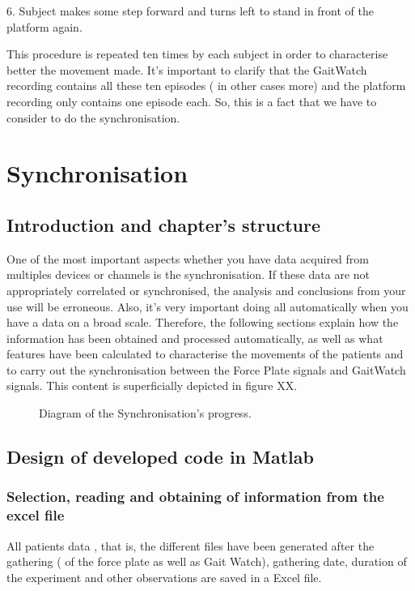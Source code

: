 6.	Subject makes some step  forward and turns left to stand in front of the platform again.

This procedure is repeated ten times by each subject in order to characterise better the movement made.
It’s important to clarify that the GaitWatch recording contains all these ten episodes ( in other cases more) and the platform recording only contains one episode each. So, this is a fact that we have to consider to do the synchronisation.

\section{Synchronisation}

\subsection{Introduction and chapter's structure}
One of the most important aspects whether you have data acquired from multiples devices or channels is the synchronisation. If these data are not appropriately correlated or synchronised, the analysis and conclusions from your use will be erroneous. Also, it’s very important doing all automatically when you have a data on a broad scale.
Therefore, the following sections explain how the information has been obtained and processed automatically, as well as what features have been calculated to characterise the movements of the patients and to carry out the synchronisation between the Force Plate signals and GaitWatch signals. This content is superficially depicted in figure XX.

\begin{figure}[H]
	\centering
	\caption{Diagram of the Synchronisation's progress.}
	\label{fig:diagramSynchronisation}
\end{figure}

\subsection{Design of developed code  in Matlab}
\subsubsection{Selection, reading and obtaining of information from the excel file}
All patients data , that is, the different files have been generated after the gathering (  of the force plate as well as Gait Watch), gathering date, duration of the experiment and other observations are saved in a Excel file. 

